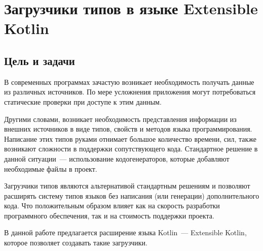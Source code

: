 \section{Загрузчики типов в языке Extensible Kotlin}



\subsection{Цель и задачи}

В современных программах зачастую возникает необходимость получать данные из различных источников.
По мере усложнения приложения могут потребоваться статические проверки при доступе к этим данным.

Другими словами, возникает необходимость представления информации из внешних источников в виде типов, свойств и методов языка программирования.
Написание этих типов руками отнимает большое количество времени, сил, также возникают сложности в поддержки сопутствующего кода.
Стандартное решение в данной ситуации~--- использование кодогенераторов, которые добавляют необходимые файлы в проект.

Загрузчики типов являются альтернативой стандартным решениям и позволяют расширять систему типов языков без написания (или генерации) дополнительного кода.
Что положительным образом влияет как на скорость разработки программного обеспечения, так и на стоимость поддержки проекта.

В данной работе предлагается расширение языка Kotlin~--- Extensible Kotlin, которое позволяет создавать такие загрузчики.



